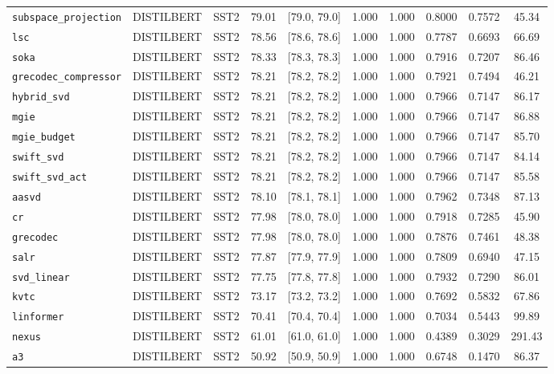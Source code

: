 \begin{table}[t]
\begin{tabular}{l l l c c c c c c c}
\texttt{subspace\_projection} & DISTILBERT & SST2 & 79.01 & [79.0, 79.0] & 1.000 & 1.000 & 0.8000 & 0.7572 & 45.34 \\
\texttt{lsc} & DISTILBERT & SST2 & 78.56 & [78.6, 78.6] & 1.000 & 1.000 & 0.7787 & 0.6693 & 66.69 \\
\texttt{soka} & DISTILBERT & SST2 & 78.33 & [78.3, 78.3] & 1.000 & 1.000 & 0.7916 & 0.7207 & 86.46 \\
\texttt{grecodec\_compressor} & DISTILBERT & SST2 & 78.21 & [78.2, 78.2] & 1.000 & 1.000 & 0.7921 & 0.7494 & 46.21 \\
\texttt{hybrid\_svd} & DISTILBERT & SST2 & 78.21 & [78.2, 78.2] & 1.000 & 1.000 & 0.7966 & 0.7147 & 86.17 \\
\texttt{mgie} & DISTILBERT & SST2 & 78.21 & [78.2, 78.2] & 1.000 & 1.000 & 0.7966 & 0.7147 & 86.88 \\
\texttt{mgie\_budget} & DISTILBERT & SST2 & 78.21 & [78.2, 78.2] & 1.000 & 1.000 & 0.7966 & 0.7147 & 85.70 \\
\texttt{swift\_svd} & DISTILBERT & SST2 & 78.21 & [78.2, 78.2] & 1.000 & 1.000 & 0.7966 & 0.7147 & 84.14 \\
\texttt{swift\_svd\_act} & DISTILBERT & SST2 & 78.21 & [78.2, 78.2] & 1.000 & 1.000 & 0.7966 & 0.7147 & 85.58 \\
\texttt{aasvd} & DISTILBERT & SST2 & 78.10 & [78.1, 78.1] & 1.000 & 1.000 & 0.7962 & 0.7348 & 87.13 \\
\texttt{cr} & DISTILBERT & SST2 & 77.98 & [78.0, 78.0] & 1.000 & 1.000 & 0.7918 & 0.7285 & 45.90 \\
\texttt{grecodec} & DISTILBERT & SST2 & 77.98 & [78.0, 78.0] & 1.000 & 1.000 & 0.7876 & 0.7461 & 48.38 \\
\texttt{salr} & DISTILBERT & SST2 & 77.87 & [77.9, 77.9] & 1.000 & 1.000 & 0.7809 & 0.6940 & 47.15 \\
\texttt{svd\_linear} & DISTILBERT & SST2 & 77.75 & [77.8, 77.8] & 1.000 & 1.000 & 0.7932 & 0.7290 & 86.01 \\
\texttt{kvtc} & DISTILBERT & SST2 & 73.17 & [73.2, 73.2] & 1.000 & 1.000 & 0.7692 & 0.5832 & 67.86 \\
\texttt{linformer} & DISTILBERT & SST2 & 70.41 & [70.4, 70.4] & 1.000 & 1.000 & 0.7034 & 0.5443 & 99.89 \\
\texttt{nexus} & DISTILBERT & SST2 & 61.01 & [61.0, 61.0] & 1.000 & 1.000 & 0.4389 & 0.3029 & 291.43 \\
\texttt{a3} & DISTILBERT & SST2 & 50.92 & [50.9, 50.9] & 1.000 & 1.000 & 0.6748 & 0.1470 & 86.37 \\

\end{tabular}
\end{table}
